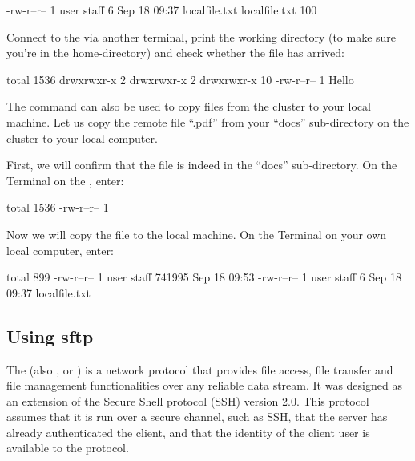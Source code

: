 \begin{prompt}
-rw-r--r-- 1 user  staff   6 Sep 18 09:37 localfile.txt
localfile.txt    100%
\end{prompt}

  Connect to the \hpc via another terminal, print the working directory (to make
  sure you're in the home-directory) and check whether the file has arrived:

\begin{prompt}
total 1536
drwxrwxr-x  2 %
drwxrwxr-x  2 %
drwxrwxr-x 10 %
-rw-r--r--  1 %
Hello
\end{prompt}

  The  command can also be used to copy files from the cluster to your local machine.
  Let us copy the remote file ``\jobname.pdf'' from your ``docs''
  sub-directory on the cluster to your local computer.

  First, we will confirm that the file is indeed in the ``docs'' sub-directory.
  On the Terminal on the \hpc, enter:

\begin{prompt}
total 1536
-rw-r--r-- 1 %
\end{prompt}

  Now we will copy the file to the local machine. On the Terminal on your own local computer, enter:

\begin{prompt}
total  899
-rw-r--r--   1 user  staff  741995 Sep 18 09:53 %
-rw-r--r--   1 user  staff       6 Sep 18 09:37 localfile.txt
\end{prompt}

  \subsection{Using sftp}

  The  (also , or ) is a network protocol that provides file access,
  file transfer and file management functionalities over any reliable data
  stream. It was designed as an extension of the Secure Shell protocol (SSH)
  version 2.0. This protocol assumes that it is run over a secure channel, such
  as SSH, that the server has already authenticated the client, and that the
  identity of the client user is available to the protocol.

